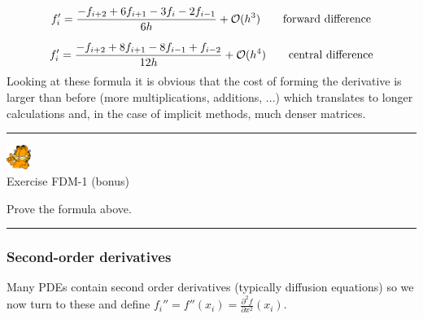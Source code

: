 \begin{equation}
f_i' = \frac{-  f_{i+2} +6 f_{i+1} - 3 f_{i} -2 f_{i-1}}{6 h} + {\cal O}(h^3)
\qquad
\text{forward difference}
\end{equation}

\begin{equation}
f_i' = \frac{-  f_{i+2} +8 f_{i+1} - 8 f_{i-1} + f_{i-2}}{12 h} + {\cal O}(h^4)
\qquad
\text{central difference}
\end{equation}
Looking at these formula it is obvious that the cost of forming the derivative 
is larger than before (more multiplications, additions, ...) which translates
to longer calculations and, in the case of implicit methods, much denser matrices. 


\begin{center}
\begin{minipage}[t]{0.77\textwidth}
\par\noindent\rule{\textwidth}{0.4pt}

\begin{center}
\includegraphics[width=0.8cm]{images/garftr} \\
{\color{orange}Exercise FDM-1 (bonus)}
\end{center}

Prove the formula above.

\par\noindent\rule{\textwidth}{0.4pt}
\end{minipage}
\end{center}





\subsubsection{Second-order derivatives}

Many PDEs contain second order derivatives (typically diffusion equations)
so we now turn to these and 
define $f_i''=f''(x_i) = \frac{\partial^2 f}{\partial x^2} (x_i)$. 

